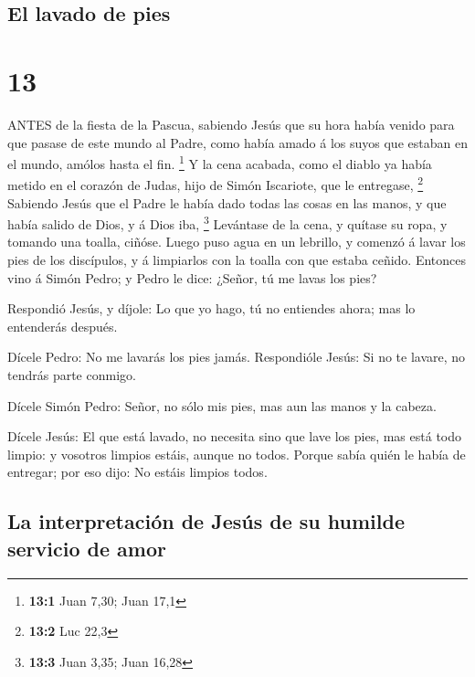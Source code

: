 \hypertarget{el-lavado-de-pies}{%
\subsection{El lavado de pies}\label{el-lavado-de-pies}}

\hypertarget{section-12}{%
\section{13}\label{section-12}}

 ANTES de la fiesta de la Pascua, sabiendo Jesús que su hora
había venido para que pasase de este mundo al Padre, como había amado á
los suyos que estaban en el mundo, amólos hasta el fin. \footnote{\textbf{13:1}
  Juan 7,30; Juan 17,1}  Y la cena acabada, como el diablo
ya había metido en el corazón de Judas, hijo de Simón Iscariote, que le
entregase, \footnote{\textbf{13:2} Luc 22,3}  Sabiendo Jesús
que el Padre le había dado todas las cosas en las manos, y que había
salido de Dios, y á Dios iba, \footnote{\textbf{13:3} Juan 3,35; Juan
  16,28}  Levántase de la cena, y quítase su ropa, y tomando
una toalla, ciñóse.  Luego puso agua en un lebrillo, y
comenzó á lavar los pies de los discípulos, y á limpiarlos con la toalla
con que estaba ceñido.  Entonces vino á Simón Pedro; y Pedro
le dice: ¿Señor, tú me lavas los pies?

 Respondió Jesús, y díjole: Lo que yo hago, tú no entiendes
ahora; mas lo entenderás después.

 Dícele Pedro: No me lavarás los pies jamás. Respondióle
Jesús: Si no te lavare, no tendrás parte conmigo.

 Dícele Simón Pedro: Señor, no sólo mis pies, mas aun las
manos y la cabeza.

 Dícele Jesús: El que está lavado, no necesita sino que
lave los pies, mas está todo limpio: y vosotros limpios estáis, aunque
no todos.  Porque sabía quién le había de entregar; por eso
dijo: No estáis limpios todos.

\hypertarget{la-interpretaciuxf3n-de-jesuxfas-de-su-humilde-servicio-de-amor}{%
\subsection{La interpretación de Jesús de su humilde servicio de
amor}\label{la-interpretaciuxf3n-de-jesuxfas-de-su-humilde-servicio-de-amor}}

